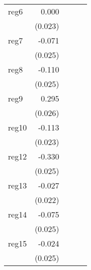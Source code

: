 {\begin{longtable}{l*{4}{D{.}{.}{-1}}}
\addlinespace
reg6        &       0.000         &                     &                     &                     \\
            &     (0.023)         &                     &                     &                     \\
\addlinespace
reg7        &      -0.071\sym{**} &                     &                     &                     \\
            &     (0.025)         &                     &                     &                     \\
\addlinespace
reg8        &      -0.110\sym{***}&                     &                     &                     \\
            &     (0.025)         &                     &                     &                     \\
\addlinespace
reg9        &       0.295\sym{***}&                     &                     &                     \\
            &     (0.026)         &                     &                     &                     \\
\addlinespace
reg10       &      -0.113\sym{***}&                     &                     &                     \\
            &     (0.023)         &                     &                     &                     \\
\addlinespace
reg12       &      -0.330\sym{***}&                     &                     &                     \\
            &     (0.025)         &                     &                     &                     \\
\addlinespace
reg13       &      -0.027         &                     &                     &                     \\
            &     (0.022)         &                     &                     &                     \\
\addlinespace
reg14       &      -0.075\sym{**} &                     &                     &                     \\
            &     (0.025)         &                     &                     &                     \\
\addlinespace
reg15       &      -0.024         &                     &                     &                     \\
            &     (0.025)         &                     &                     &                     \\

\end{longtable}}
